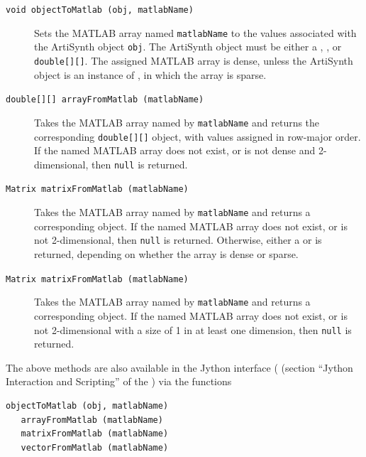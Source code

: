 \documentclass{article}
\begin{document}
\begin{description}

\item[{\tt void objectToMatlab (obj, matlabName)} ] \mbox{}

Sets the MATLAB array named {\tt matlabName} to the values associated
with the ArtiSynth object {\tt obj}. The ArtiSynth object must be
either a ,
, or {\tt double[][]}.  The assigned MATLAB
array is dense, unless the ArtiSynth object is an instance of
, in which the array
is sparse.

\item[{\tt double[][] arrayFromMatlab (matlabName)}] \mbox{}

Takes the MATLAB array named by {\tt matlabName} and returns the
corresponding {\tt double[][]} object, with values assigned in
row-major order. If the named MATLAB array does not exist, or is not
dense and 2-dimensional, then {\tt null} is returned.

\item[{\tt Matrix matrixFromMatlab (matlabName)}] \mbox{}

Takes the MATLAB array named by {\tt matlabName} and returns a
corresponding  object.  If the named
MATLAB array does not exist, or is not 2-dimensional, then {\tt null}
is returned. Otherwise, either a 
or  is returned, depending
on whether the array is dense or sparse.

\item[{\tt Matrix matrixFromMatlab (matlabName)}] \mbox{}

Takes the MATLAB array named by {\tt matlabName} and returns a
corresponding  object.  If the
named MATLAB array does not exist, or is not 2-dimensional with a size
of 1 in at least one dimension, then {\tt null} is returned.

\end{description}

The above methods are also available in the Jython interface (
(section ``Jython Interaction and Scripting'' of the
) via the functions
%
\begin{lstlisting}[]
   objectToMatlab (obj, matlabName)
   arrayFromMatlab (matlabName)
   matrixFromMatlab (matlabName)
   vectorFromMatlab (matlabName)
\end{lstlisting}
%
\end{document}
